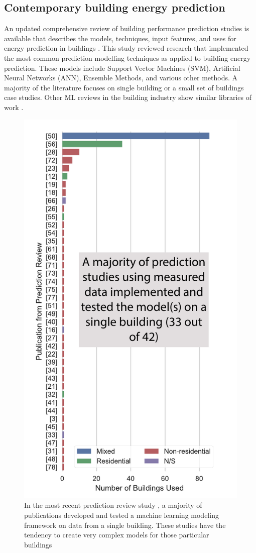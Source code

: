 \documentclass[preprint,12pt]{elsarticle}
\begin{document}
\subsection{Contemporary building energy prediction}
An updated comprehensive review of building performance prediction studies is available that describes the models, techniques, input features, and uses for energy prediction in buildings \cite{Amasyali2018AStudies}. This study reviewed research that implemented the most common prediction modelling techniques as applied to building energy prediction. These models include Support Vector Machines (SVM), Artificial Neural Networks (ANN), Ensemble Methods, and various other methods. A majority of the literature focuses on single building or a small set of buildings case studies. Other ML reviews in the building industry show similar libraries of work \cite{Foucquier2013StateReview, Massana2015Short-termAttributes}.

\begin{figure}[ht!]
\begin{center}
\includegraphics[width=0.4\columnwidth]{figures/numberofbuildings_annotated.pdf}
\caption{In the most recent prediction review study \cite{Amasyali2018AStudies}, a majority of publications developed and tested a machine learning modeling framework on data from a single building. These studies have the tendency to create very complex models for those particular buildings}
\label{fig:numberofsamples}%
\end{center}
\end{figure}
\end{document}
